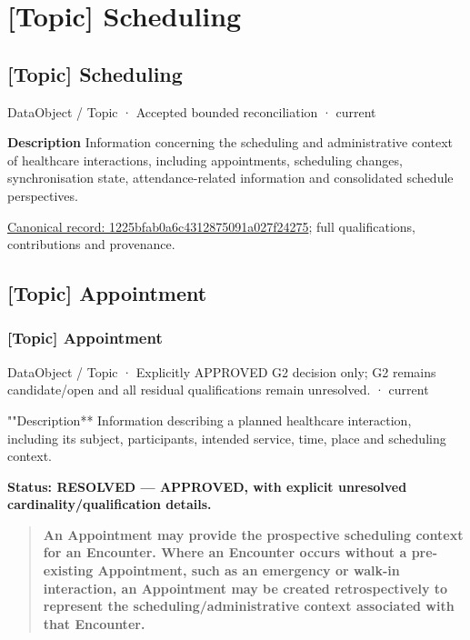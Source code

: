 \section{[Topic] Scheduling}

\subsection{[Topic] Scheduling}

\label{element:1225bfab0a6c4312875091a027f24275}
{\small DataObject / Topic · Accepted bounded reconciliation · current}\par

\textbf{Description}
Information concerning the scheduling and administrative context of healthcare interactions, including appointments, scheduling changes, synchronisation state, attendance-related information and consolidated schedule perspectives.


{\footnotesize \href{../../../../continuum/application/data-object/topic/1225bfab0a6c4312875091a027f24275.md}{Canonical record: 1225bfab0a6c4312875091a027f24275}; full qualifications, contributions and provenance.}\par
\subsection{[Topic] Appointment}

\subsubsection{[Topic] Appointment}

\label{element:9badf0d360b64215bc60e74eec954018}
{\small DataObject / Topic · Explicitly APPROVED G2 decision only; G2 remains candidate/open and all residual qualifications remain unresolved. · current}\par

""Description**
Information describing a planned healthcare interaction, including its subject, participants, intended service, time, place and scheduling context.



\textbf{Status: RESOLVED — APPROVED, with explicit unresolved cardinality/qualification details.}



\begin{quote}


\textbf{An Appointment may provide the prospective scheduling context for an Encounter. Where an Encounter occurs without a pre-existing Appointment, such as an emergency or walk-in interaction, an Appointment may be created retrospectively to represent the scheduling/administrative context associated with that Encounter.}



\end{quote}


